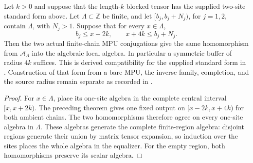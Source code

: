 \begin{lemma}
    \label{thm:mpu_finite_heisenberg_arbitrary_region_compatibility}
    \leanok
    Let $k>0$ and suppose that the length-$k$ blocked tensor has the
    supplied two-site standard form above. Let $\Lambda\subset\mathbb Z$
    be finite, and let $[b_j,b_j+N_j)$, for $j=1,2$, contain $\Lambda$,
    with $N_j>1$. Suppose that for every $x\in\Lambda$,
    \[
        b_j\le x-2k,
        \qquad x+4k\le b_j+N_j .
    \]
    Then the two actual finite-chain MPU conjugations give the same
    homomorphism from $\mathcal A_\Lambda$ into the algebraic local
    algebra. In particular a symmetric buffer of radius $4k$ suffices.
    This is derived compatibility for the supplied standard form in
    \cite[lines~2300--2306]{Cirac2017MPU}. Construction of that form from
    a bare MPU, the inverse family, completion, and the source radius
    remain separate as recorded in
    \cite{gap:mpu_qca_complete_block_heisenberg_scope}.
\end{lemma}
\begin{proof}\leanok
    For $x\in\Lambda$, place its one-site algebra in the complete central
    interval $[x,x+2k)$. The preceding theorem gives one fixed output
    on $[x-2k,x+4k)$ for both ambient chains. The two homomorphisms
    therefore agree on every one-site algebra in $\Lambda$. These
    algebras generate the complete finite-region algebra: disjoint
    regions generate their union by matrix tensor expansion, so
    induction over the sites places the whole algebra in the
    equalizer. For the empty region, both homomorphisms preserve its
    scalar algebra.
\end{proof}


